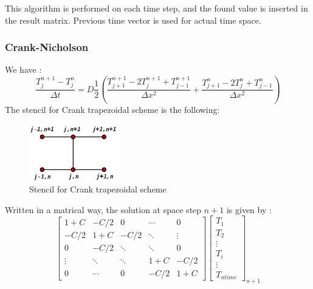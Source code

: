 \documentclass{article}
\begin{document}
                    This algorithm is performed on each time step, and the found value is inserted in the 
                    result matrix. Previous time vector is used for actual time space.

                    \subsubsection{Crank-Nicholson}
                        We have :
                        \begin{equation}
                            \frac{T_{j}^{n+1} - T_{j}^n}{\Delta t} = D\frac{1}{2} (\frac{T_{j+1}^{n+1}- 2T_{j}^{n+1} + T_{j-1}^{n+1}}{\Delta x^2}+\frac{T_{j+1}^{n}- 2T_{j}^{n} + T_{j-1}^{n}}{\Delta x^2})
                        \end{equation}
                        The stencil for Crank trapezoidal scheme is the following:
                        \begin{figure}[H]
                            \includegraphics[width=4cm]{stencil_crank.png}
                            \centering
                            \caption{Stencil for Crank trapezoidal scheme}
                        \end{figure}
                        Written in a matrical way, the solution at space step $n+1$ is given by :
                        \begin{equation}
                            \begin{bmatrix}
                                1+C    & -C/2   & 0     & \cdots & 0 \\
                                -C/2   & 1+C    & -C/2   & \ddots & \vdots \\
                                0      & -C/2   & \ddots & \ddots & 0 \\
                                \vdots & \ddots & \ddots & 1+C   & -C/2\\
                                0      & \cdots & 0      & -C/2   & 1+C
                            \end{bmatrix}
                            \begin{bmatrix}
                                T_{1} \\
                                T_{2} \\
                                \vdots \\
                                T_{i} \\
                                \vdots \\
                                T_{ntime}
                            \end{bmatrix}_{n+1}
                            \label{eq:crank}
                        \end{equation}
\end{document}
